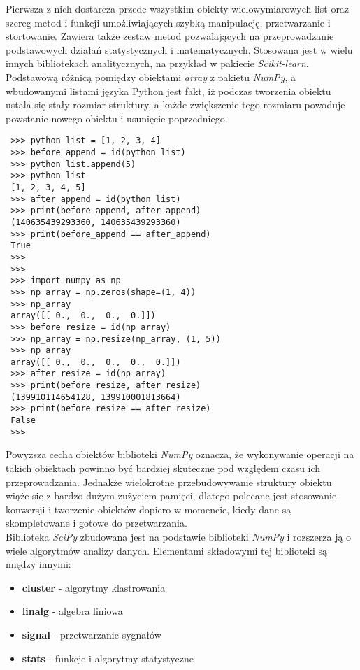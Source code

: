Pierwsza z nich dostarcza przede wszystkim obiekty wielowymiarowych list oraz szereg metod i funkcji umożliwiających szybką manipulację, przetwarzanie i stortowanie.
Zawiera także zestaw metod pozwalających na przeprowadzanie podstawowych działań statystycznych i matematycznych\cite{numpy_ug}. Stosowana jest w wielu innych bibliotekach analitycznych, na przykład w pakiecie \textit{Scikit-learn}.\\

Podstawową różnicą pomiędzy obiektami \textit{array} z pakietu \textit{NumPy}, a wbudowanymi listami języka Python jest fakt, iż podczas tworzenia obiektu ustala się stały rozmiar struktury, 
a każde zwiększenie tego rozmiaru powoduje powstanie nowego obiektu i usunięcie poprzedniego.
\begin{lstlisting}
 >>> python_list = [1, 2, 3, 4]
 >>> before_append = id(python_list)
 >>> python_list.append(5)
 >>> python_list
 [1, 2, 3, 4, 5]
 >>> after_append = id(python_list)
 >>> print(before_append, after_append)
 (140635439293360, 140635439293360)
 >>> print(before_append == after_append)
 True
 >>> 
 >>> 
 >>> import numpy as np
 >>> np_array = np.zeros(shape=(1, 4))
 >>> np_array
 array([[ 0.,  0.,  0.,  0.]])
 >>> before_resize = id(np_array)
 >>> np_array = np.resize(np_array, (1, 5))
 >>> np_array
 array([[ 0.,  0.,  0.,  0.,  0.]])
 >>> after_resize = id(np_array)
 >>> print(before_resize, after_resize)
 (139910114654128, 139910001813664)
 >>> print(before_resize == after_resize)
 False
 >>> 
\end{lstlisting}

Powyższa cecha obiektów biblioteki \textit{NumPy} oznacza, że wykonywanie operacji na takich obiektach powinno być bardziej skuteczne pod względem czasu ich przeprowadzania.
Jednakże wielokrotne przebudowywanie struktury obiektu wiąże się z bardzo dużym zużyciem pamięci, dlatego polecane jest stosowanie konwersji i tworzenie obiektów dopiero w momencie, kiedy dane są skompletowane i gotowe do przetwarzania\cite{numpy_ug}.\\

Biblioteka \textit{SciPy} zbudowana jest na podstawie biblioteki \textit{NumPy} i rozszerza ją o wiele algorytmów analizy danych.
Elementami składowymi tej biblioteki są między innymi\cite{numpy_ug}:
\begin{itemize}
 \item \textbf{cluster} - algorytmy klastrowania
 \item \textbf{linalg} - algebra liniowa
 \item \textbf{signal} - przetwarzanie sygnałów
 \item \textbf{stats} - funkcje i algorytmy statystyczne
\end{itemize}

